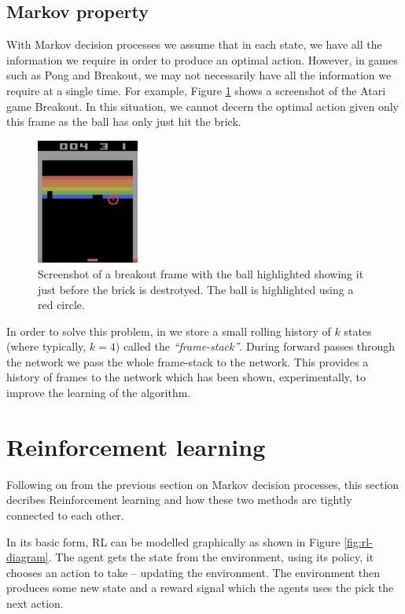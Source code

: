 \subsection{Markov property}
\label{dsgn:sec:markov-prop}
With Markov decision processes we assume that in each state, we have all the information we require in order to produce an optimal action. However, in games such as Pong and Breakout, we may not necessarily have all the information we require at a single time. For example, Figure \ref{fig:breakout-brick-fig} shows a screenshot of the Atari game Breakout. In this situation, we cannot decern the optimal action given only this frame as the ball has only just hit the brick.

\begin{figure}[htbp]
	\centering
	\includegraphics[width=0.30\textwidth]{chapters/chapter3/images/breakout.png}
	\caption[Screenshot of single breakout frame]{Screenshot of a breakout frame with the ball highlighted showing it just before the brick is destrotyed. The ball is highlighted using a red circle.
		\label{fig:breakout-brick-fig}
	}
\end{figure}

In order to solve this problem, in we store a small rolling history of $k$ states (where typically, $k = 4$) called the \textit{``frame-stack''}. During forward passes through the network we pass the whole frame-stack to the network. This provides a history of frames to the network which has been shown, experimentally, to improve the learning of the algorithm.

\section{Reinforcement learning}
\label{dsgn:sec:rl}
Following on from the previous section on Markov decision processes, this section decribes Reinforcement learning and how these two methods are tightly connected to each other.

In its basic form, RL can be modelled graphically as shown in Figure \ref{fig:rl-diagram}. The agent gets the state from the environment, using its policy, it chooses an action to take -- updating the environment. The environment then produces some new state and a reward signal which the agents uses the pick the next action.

